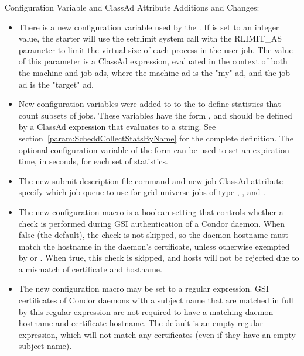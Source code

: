 \noindent Configuration Variable and ClassAd Attribute Additions and Changes:

\begin{itemize}

\item There is a new configuration variable used by the .
If  is set to an integer value, the starter
will use the setrlimit system call with the RLIMIT\_AS parameter to
limit the virtual size of each process in the user job.  The value of
this parameter is a ClassAd expression, evaluated in the context of both
the machine and job ads, where the machine ad is the "my" ad, and the job 
ad is the "target" ad.

\item New configuration variables were added to to the  to
define statistics that count subsets of jobs. 
These variables have the form ,
and should be defined by a ClassAd expression that evaluates to a string.
See section~\ref{param:ScheddCollectStatsByName}
for the complete definition.
The optional configuration variable of the form
 can be used to set an expiration time,
in seconds, for each set of statistics.

\item The new  submit description file command
and new job ClassAd attribute  specify which job
queue to use for grid universe jobs of type
, , and .

\item The new configuration macro  is
a boolean setting that controls whether a check is performed during
GSI authentication of a Condor daemon.  When false (the default),
the check is not skipped, so the daemon hostname must match the
hostname in the daemon's certificate, unless otherwise exempted
by  or
.
When true, this check is skipped, and hosts will not be rejected
due to a mismatch of certificate and hostname.

\item The new configuration macro
 may be set to a
regular expression.  GSI certificates of Condor daemons with a
subject name that are matched in full by this regular expression
are not required to have a matching daemon hostname and certificate
hostname.  The default is an empty regular expression, which will
not match any certificates (even if they have an empty subject name).

\end{itemize}

